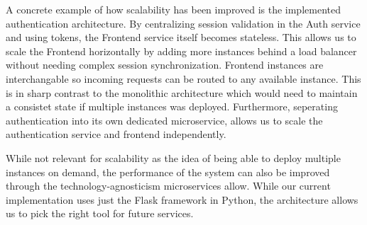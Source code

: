 A concrete example of how scalability has been improved is the implemented authentication architecture.
By centralizing session
validation in the Auth service and using tokens, the Frontend service itself becomes stateless. 
This allows us to scale the Frontend horizontally by adding more instances behind a load balancer
without needing complex session synchronization.
Frontend instances are interchangable so incoming requests can be routed to any available instance.
This is in sharp contrast to the monolithic architecture which would need to maintain a consistet state
if multiple instances was deployed.
Furthermore, seperating authentication into its own dedicated microservice, allows us
to scale the authentication service and frontend independently.

While not relevant for scalability as the idea of being able to deploy multiple instances on demand,
the performance of the system can also be improved through the technology-agnosticism microservices allow.
While our current implementation uses just the
Flask framework in Python, the architecture allows us to pick the right tool for future services.

